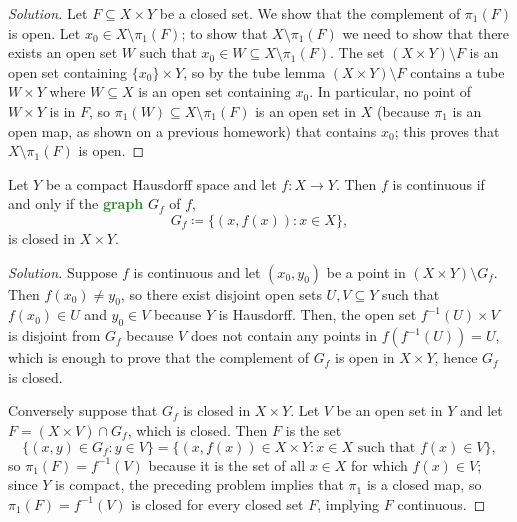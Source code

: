 \documentclass[10pt]{article}
\providecommand{\inv}{^{-1}}
\newenvironment{soln}{\begin{proof}[Solution]}{\end{proof}}
\providecommand{\vocab}[1]{{\textbf{\textcolor{ForestGreen}{#1}}}}
\begin{document}
\begin{soln}
    Let $F\subseteq X\times Y$ be a closed set.
    We show that the complement of $\pi_1(F)$ is open.
    Let $x_0\in X\setminus\pi_1(F)$;
    to show that $X\setminus\pi_1(F)$ we need to show that
    there exists an open set $W$ such that $x_0\in W\subseteq X\setminus\pi_1(F)$.
    The set $(X\times Y)\setminus F$
    is an open set containing $\{x_0\}\times Y$,
    so by the tube lemma $(X\times Y)\setminus F$ contains
    a tube $W\times Y$ where $W\subseteq X$ is an open set containing $x_0$.
    In particular, no point of $W\times Y$ is in $F$, so
    $\pi_1(W)\subseteq X\setminus\pi_1(F)$ is an open set in $X$ (because
    $\pi_1$ is an open map, as shown on a previous homework)
    that contains $x_0$; this proves that $X\setminus\pi_1(F)$ is open.
\end{soln}

\begin{problem}
    [Munkres 26.8]
    Let $Y$ be a compact Hausdorff space
    and let $f\colon X\to Y$. Then $f$ is continuous
    if and only if the \vocab{graph} $G_f$ of $f$,
    \begin{equation*}
	G_f \coloneq \{(x,f(x)) : x\in X\},
    \end{equation*}
    is closed in $X\times Y$.
\end{problem}

\begin{soln}
    Suppose $f$ is continuous and let $(x_0,y_0)$ be
    a point in $(X\times Y)\setminus G_f$.
    Then $f(x_0)\ne y_0$, so there exist disjoint open sets
    $U,V\subseteq Y$ such that $f(x_0)\in U$ and $y_0\in V$
    because $Y$ is Hausdorff. Then, the open set
    $f\inv(U)\times V$ is disjoint from $G_f$
    because $V$ does not contain any points in $f(f\inv(U)) = U$,
    which is enough to prove that the complement of $G_f$ is open in $X\times Y$,
    hence $G_f$ is closed.

    Conversely suppose that $G_f$ is closed in $X\times Y$.
    Let $V$ be an open set in $Y$ and let $F = (X\times V)\cap G_f$,
    which is closed. Then $F$ is the set
    \begin{equation*}
	\{(x,y)\in G_f : y\in V\} =
	\{(x,f(x))\in X\times Y : x\in X\text{ such that }f(x)\in V\},
    \end{equation*}
    so $\pi_1(F) = f\inv(V)$ because it is the set of all $x\in X$
    for which $f(x)\in V$; since $Y$ is compact, the preceding problem
    implies that $\pi_1$ is a closed map, so $\pi_1(F) = f\inv(V)$ is closed
    for every closed set $F$, implying $F$ continuous.
\end{soln}
\end{document}
